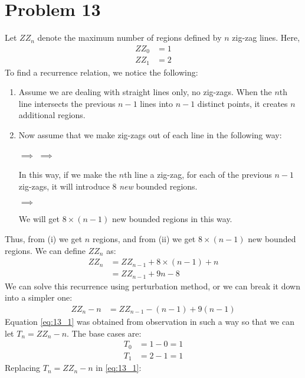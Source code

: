 \section*{Problem 13}
Let $ZZ_n$ denote the maximum number of regions defined by $n$ zig-zag lines. Here,
\begin{align*}
    ZZ_0 & = 1 \\
    ZZ_1 & = 2
\end{align*}
To find a recurrence relation, we notice the following:
\begin{enumerate}[label=(\roman*)]
    \item Assume we are dealing with straight lines only, no zig-zags. When the $n$th line intersects the previous $n-1$ lines into $n-1$ distinct points, it creates $n$ additional regions.
    \item Now assume that we make zig-zags out of each line in the following way:
          \begin{center}
               $\implies$  $\implies$ 
          \end{center}

          In this way, if we make the $n$th line a zig-zag, for each of the previous $n-1$ zig-zags, it will introduce $8$ \textit{new} bounded regions.
          \begin{center}
               $\implies$ 
          \end{center}
          We will get $8\times (n-1)$ new bounded regions in this way.
\end{enumerate}
Thus, from (i) we get $n$ regions, and from (ii) we get $8\times (n-1)$ new bounded regions. We can define $ZZ_n$ as:
\begin{align}
    ZZ_n & = ZZ_{n-1} + 8\times(n-1) + n \nonumber \\
         & = ZZ_{n-1} + 9n - 8
\end{align}
We can solve this recurrence using perturbation method, or we can break it down into a simpler one:
\begin{align}
    ZZ_n - n & = ZZ_{n-1} - (n-1) + 9(n-1) \label{eq:13_1}
\end{align}
Equation \eqref{eq:13_1} was obtained from observation in such a way so that we can let $T_n = ZZ_n - n$. The base cases are:
\begin{align*}
    T_0 & = 1 - 0 = 1 \\
    T_1 & = 2 - 1 = 1
\end{align*}
Replacing $T_n = ZZ_n - n$ in \eqref{eq:13_1}:

